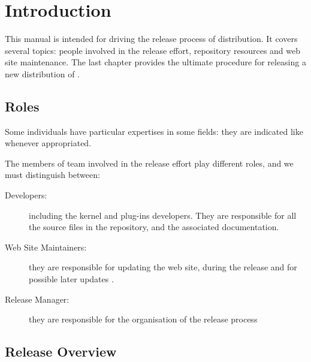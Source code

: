 \chapter{Introduction}

This manual is intended for driving the release process of \FramaC
distribution. It covers several topics: people involved in the release effort,
repository resources and web site maintenance. The last chapter provides the
ultimate procedure for releasing a new distribution of \FramaC.

\section{Roles}

Some individuals have particular expertises in some fields: they are indicated
like  whenever appropriated.

The members of \FramaC team involved in the release effort play different
roles, and we must distinguish between:

\begin{description}
\item[Developers:] including the kernel and plug-ins developers. They
  are responsible for all the source files in the repository, and the
  associated documentation.
\item[Web Site Maintainers:] they are responsible for updating the web site,
  during the release and for possible later updates .
\item[Release Manager:] they are responsible for the organisation of the
  release process
\end{description}

\section{Release Overview}

